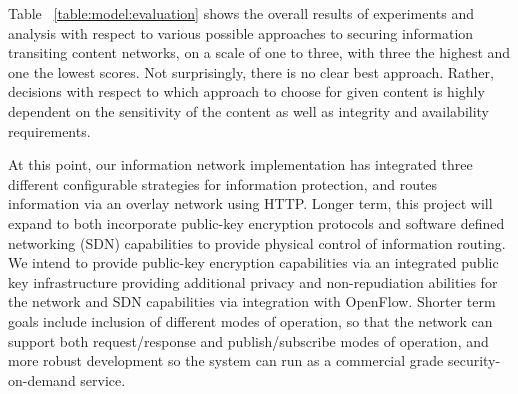 Table ~\ref{table:model:evaluation} shows the overall results of experiments and analysis with respect to various possible approaches to securing information transiting content networks, on a scale of one to three, with three the highest and one the lowest scores.  Not surprisingly, there is no clear best approach.  Rather, decisions with respect to which approach to choose for given content is highly dependent on the sensitivity of the content as well as integrity and availability requirements.
	
At this point, our information network implementation has integrated three different configurable strategies for information protection, and routes information via an overlay network using HTTP.  Longer term, this project will expand to both incorporate public-key encryption protocols and software defined networking (SDN) capabilities to provide physical control of information routing.  We intend to provide public-key encryption capabilities via an integrated public key infrastructure providing additional privacy and non-repudiation abilities for the network and SDN capabilities via integration with OpenFlow.  Shorter term goals include inclusion of different modes of operation, so that the network can support both request/response and publish/subscribe modes of operation, and more robust development so the system can run as a commercial grade security-on-demand service.
